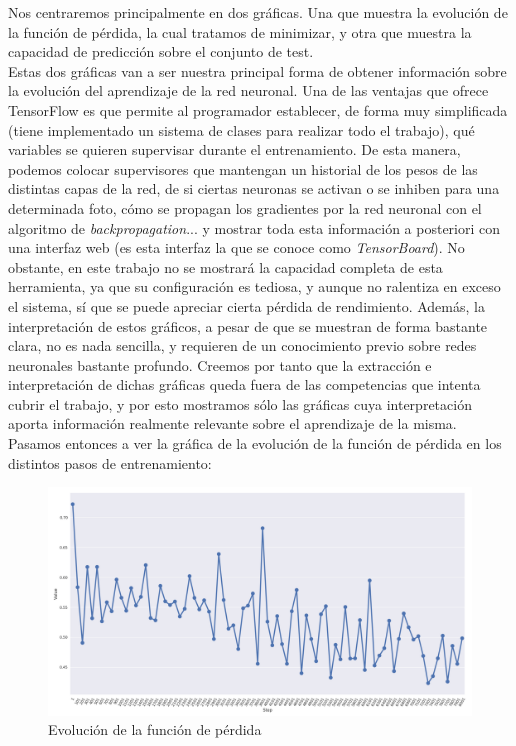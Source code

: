 \documentclass[11pt]{article}
\theoremstyle{plain}
\theoremstyle{definition}
\begin{document}
Nos centraremos principalmente en dos gráficas. Una que muestra la
evolución de la función de pérdida, la cual tratamos de minimizar, y
otra que muestra la capacidad de predicción sobre el conjunto de test.\\

Estas dos gráficas van a ser nuestra principal forma de obtener
información sobre la evolución del aprendizaje de la red neuronal. Una
de las ventajas que ofrece TensorFlow es que permite al programador
establecer, de forma muy simplificada (tiene implementado un sistema
de clases para realizar todo el trabajo), qué variables se quieren
supervisar durante el entrenamiento. De esta manera, podemos colocar
supervisores que mantengan un historial de los pesos de las distintas
capas de la red, de si ciertas neuronas se activan o se inhiben para
una determinada foto, cómo se propagan los gradientes por la red
neuronal con el algoritmo de \textit{backpropagation}... y mostrar
toda esta información a posteriori con una interfaz web (es esta
interfaz la que se conoce como \textit{TensorBoard}). No obstante, en
este trabajo no se mostrará la capacidad completa de esta herramienta,
ya que su configuración es tediosa, y aunque no ralentiza en exceso el
sistema, sí que se puede apreciar cierta pérdida de
rendimiento. Además, la interpretación de estos gráficos, a pesar de
que se muestran de forma bastante clara, no es nada sencilla, y
requieren de un conocimiento previo sobre redes neuronales bastante
profundo. Creemos por tanto que la extracción e interpretación de
dichas gráficas queda fuera de las competencias que intenta cubrir el
trabajo, y por esto mostramos sólo las gráficas cuya interpretación
aporta información realmente relevante sobre el aprendizaje de la
misma.\\

Pasamos entonces a ver la gráfica de la evolución de la función de
pérdida en los distintos pasos de entrenamiento:

\begin{figure}[H]
  \centering \includegraphics[width=.95\textwidth]{imgs/loss_base}
  \caption{Evolución de la función de pérdida}
\end{figure}
\end{document}
